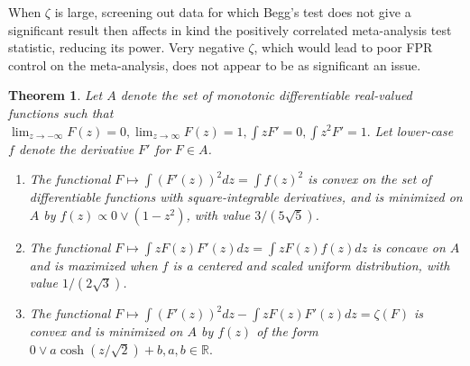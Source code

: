 \documentclass[12pt]{article}
\newtheorem{theorem}{Theorem}
\newcommand{\zdiff}{\zeta}
\begin{document}
When $\zdiff$ is large, screening out data for which Begg's test does
not give a significant result then affects in kind the positively
correlated meta-analysis test statistic, reducing its power. %
Very negative $\zdiff$, which would lead to poor FPR control on the meta-analysis, does not appear to be as significant an issue.
\begin{theorem}\label{thrm:extremization} Let $A$ denote the set of
  monotonic differentiable real-valued functions such that
  $\lim_{z\to -\infty}F(z)=0,\lim_{z\to \infty}F(z)=1,\int z F'=0,
  \int z^2 F'=1.$ Let lower-case $f$ denote the derivative $F'$ for $F\in A$.
  \begin{enumerate}
  \item The functional $F \mapsto \int (F'(z))^2 dz=\int f(z)^2$ is
    convex on the set of differentiable functions with
    square-integrable derivatives, and is minimized on $A$ by
    $f(z) \propto 0\vee (1-z^2)$, with value $3/(5\sqrt{5})$.
  \item The functional
    $F \mapsto \int z F(z) F'(z)dz = \int z F(z) f(z)dz$ is concave on $A$ and is maximized when $f$ is a centered and scaled uniform
    distribution, with value $1/(2\sqrt{3})$.
  \item The functional $F \mapsto \int (F'(z))^2 dz -  \int z F(z) F'(z)dz=\zdiff(F)$ is convex and is minimized on $A$ by $f(z)$ of the form $0\vee a\cosh(z/\sqrt{2})+b, a,b\in\mathbb{R}.$
  \end{enumerate}
\end{theorem}
\end{document}
